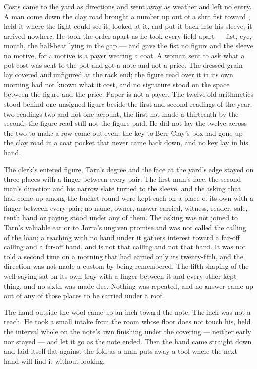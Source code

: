 Costs came to the yard as directions and went away as weather and left no entry. A man come down the clay road brought a number up out of a shut fist toward , held it where the light could see it, looked at it, and put it back into his sleeve; it arrived nowhere. He took the order apart as he took every field apart --- fist, eye, mouth, the half-beat lying in the gap --- and gave the fist no figure and the sleeve no motive, for a motive is a payer wearing a coat. A woman sent to ask what a pot cost was sent to the pot and got a note and not a price. The dressed grain lay covered and unfigured at the rack end; the figure read over it in its own morning had not known what it cost, and no signature stood on the space between the figure and the price. Paper is not a payer. The twelve old arithmetics stood behind one unsigned figure beside the first and second readings of the year, two readings two and not one account, the first not made a thirteenth by the second, the figure read still not the figure paid. He did not lay the twelve across the two to make a row come out even; the key to Berr Clay's box had gone up the clay road in a coat pocket that never came back down, and no key lay in his hand.

The clerk's entered figure, Tarn's degree and the face at the yard's edge stayed on three places with a finger between every pair. The first man's face, the second man's direction and his narrow slate turned to the sleeve, and the asking that had come up among the bucket-round were kept each on a place of its own with a finger between every pair; no name, owner, answer carried, witness, reader, sale, tenth hand or paying stood under any of them. The asking was not joined to Tarn's valuable ear or to Jorra's ungiven promise and was not called the calling of the loan; a reaching with no hand under it gathers interest toward a far-off calling and a far-off hand, and is not that calling and not that hand. It was not told a second time on a morning that had earned only its twenty-fifth, and the direction was not made a custom by being remembered. The fifth shaping of the well-saying sat on its own tray with a finger between it and every other kept thing, and no sixth was made due. Nothing was repeated, and no answer came up out of any of those places to be carried under a roof.

The hand outside the wool came up an inch toward the note. The inch was not a reach. He took a small intake from the room whose floor does not touch his, held the interval whole on the note's own finishing under the covering --- neither early nor stayed --- and let it go as the note ended. Then the hand came straight down and laid itself flat against the fold as a man puts away a tool where the next hand will find it without looking.

